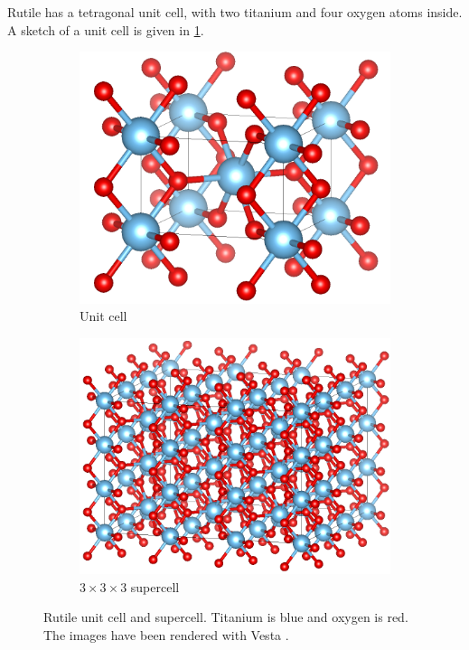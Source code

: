 Rutile has a tetragonal unit cell, with two titanium and four oxygen atoms inside. A sketch of a unit cell is given in \cref{fig:rutile}.
\begin{figure}
    \centering
    \begin{subfigure}[t]{0.48\textwidth}
        \centering
        \includegraphics[width=1\textwidth]{figures/rutile.png}
        \caption{Unit cell}
        \label{fig:rutile}
    \end{subfigure}
    \hfill
    \begin{subfigure}[t]{0.48\textwidth}
        \centering
        \includegraphics[width=1\textwidth]{figures/supercell.png}
        \caption{$3\times3\times3$ supercell}
        \label{fig:supercell}
    \end{subfigure}
    \caption[Rutile unit cell and supercell]{Rutile unit cell and supercell. Titanium is blue and oxygen is red. The images have been rendered with Vesta \cite{zotero-174}.}
\end{figure}
